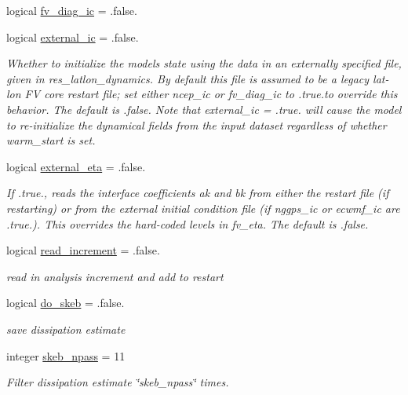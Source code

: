 \begin{DoxyCompactItemize}
\item 
logical \hyperlink{structfv__arrays__mod_1_1fv__flags__type_abfbf7d7bd8fd7655bdae79c3c8a28729}{fv\-\_\-diag\-\_\-ic} = .false.
\item 
logical \hyperlink{structfv__arrays__mod_1_1fv__flags__type_a82a8f4d18e0103ee3eb70e6175b6eaa3}{external\-\_\-ic} = .false.
\begin{DoxyCompactList}\small\item\em Whether to initialize the models state using the data in an externally specified file, given in res\-\_\-latlon\-\_\-dynamics. By default this file is assumed to be a legacy lat-\/lon F\-V core restart file; set either ncep\-\_\-ic or fv\-\_\-diag\-\_\-ic to .true.\-to override this behavior. The default is .false. Note that external\-\_\-ic = .true. will cause the model to re-\/initialize the dynamical fields from the input dataset regardless of whether warm\-\_\-start is set. \end{DoxyCompactList}\item 
logical \hyperlink{structfv__arrays__mod_1_1fv__flags__type_a5b7f59a6a09f6aef71d0c7fe841dfdf7}{external\-\_\-eta} = .false.
\begin{DoxyCompactList}\small\item\em If .true., reads the interface coefficients ak and bk from either the restart file (if restarting) or from the external initial condition file (if nggps\-\_\-ic or ecwmf\-\_\-ic are .true.). This overrides the hard-\/coded levels in fv\-\_\-eta. The default is .false. \end{DoxyCompactList}\item 
logical \hyperlink{structfv__arrays__mod_1_1fv__flags__type_ac196d8079631a973acd89c9137e2b7be}{read\-\_\-increment} = .false.
\begin{DoxyCompactList}\small\item\em read in analysis increment and add to restart \end{DoxyCompactList}\item 
logical \hyperlink{structfv__arrays__mod_1_1fv__flags__type_aa0cf5ca404f9d2be70ab5e49e0dc202c}{do\-\_\-skeb} = .false.
\begin{DoxyCompactList}\small\item\em save dissipation estimate \end{DoxyCompactList}\item 
integer \hyperlink{structfv__arrays__mod_1_1fv__flags__type_a7ccd8f4ddaf20ca9442d71fcc09848cb}{skeb\-\_\-npass} = 11
\begin{DoxyCompactList}\small\item\em Filter dissipation estimate \char`\"{}skeb\-\_\-npass\char`\"{} times. \end{DoxyCompactList}\item 

\end{DoxyCompactItemize}

